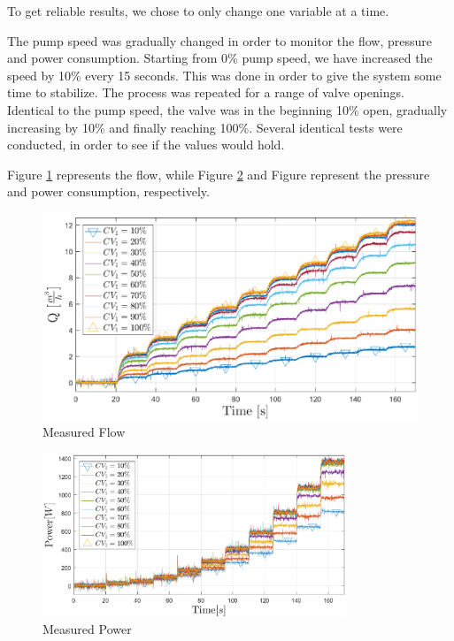 To get reliable results, we chose to only change one variable at a time.

The pump speed was gradually changed in order to monitor the flow, pressure and power consumption.
Starting from 0\% pump speed, we have increased the speed by 10\% every 15 seconds. This was done
in order to give the system some time to stabilize. The process was repeated for a range of valve openings.
Identical to the pump speed, the valve was in the beginning 10\% open, gradually increasing by 10\% and
finally reaching 100\%.
Several identical tests were conducted, in order to see if the values would hold.

Figure \ref{fig:measuredFlow} represents the flow, while Figure \ref{fig:measuredPower}
and Figure represent the pressure and power consumption, respectively.

\begin{figure}[ht]
	\centering
	\includegraphics[scale=0.5]{figures/05mathematicalModelling/measuredFlow.eps}
	\vspace{-5mm}
	\caption{Measured Flow}
	\label{fig:measuredFlow}
\end{figure}
\vspace{-5mm}
\begin{figure}[ht]
	\centering
	\includegraphics[width=0.81\textwidth]{figures/05mathematicalModelling/measuredPower.eps}
	\vspace{-5mm}
	\caption{Measured Power}
	\label{fig:measuredPower}
\end{figure}


